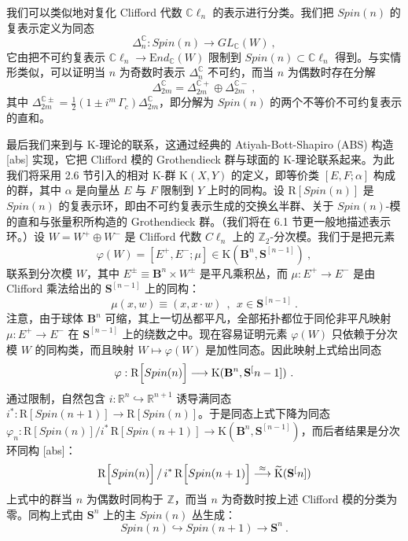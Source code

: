 \documentclass[11pt,a4paper]{ctexart}
\begin{document}
我们可以类似地对复化 Clifford 代数 \({\mathbb{C}}\ell_n\) 的表示进行分类。我们把 \(Spin(n)\) 的复表示定义为同态 \[\Delta^{{\mathbb{C}}}_n: Spin(n)\longrightarrow GL_{{\mathbb{C}}}(W)\ ,\] 它由把不可约复表示 \({\mathbb{C}}\ell_n
\rightarrow {\mathrm End}_{{\mathbb{C}}}(W)\) 限制到 \(Spin(n)\subset{\mathbb{C}}\ell_n\) 得到。与实情形类似，可以证明当 \(n\) 为奇数时表示 \(\Delta_n^{{\mathbb{C}}}\) 不可约，而当 \(n\) 为偶数时存在分解 \[\Delta_{2m}^{{\mathbb{C}}}=\Delta_{2m}^{{\mathbb{C}} +}\oplus
\Delta_{2m}^{{\mathbb{C}} -}\ ,\] 其中 \(\Delta_{2m}^{{\mathbb{C}}\pm}=\frac12(1\pm i^m\,\Gamma_c)
\Delta_{2m}^{{\mathbb{C}}}\)，即分解为 \(Spin(n)\) 的两个不等价不可约复表示的直和。

最后我们来到与 K-理论的联系，这通过经典的 Atiyah-Bott-Shapiro (ABS) 构造 [abs] 实现，它把 Clifford 模的 Grothendieck 群与球面的 K-理论联系起来。为此我们将采用 2.6 节引入的相对 K-群 \({\mathrm K}(X,Y)\) 的定义，即等价类 \([E,F;\alpha]\) 构成的群，其中 \(\alpha\) 是向量丛 \(E\) 与 \(F\) 限制到 \(Y\) 上时的同构。设 \({\mathrm R}[Spin(n)]\) 是 \(Spin(n)\) 的复表示环，即由不可约复表示生成的交换幺半群、关于 \(Spin(n)\)-模的直和与张量积所构造的 Grothendieck 群。（我们将在 6.1 节更一般地描述表示环。）设 \(W=W^+\oplus W^-\) 是 Clifford 代数 \(C\ell_n\) 上的 \({\mathbb{Z}}_2\)-分次模。我们于是把元素 \[\varphi(W)=[E^+,E^-;\mu]\in {\mathrm K}({\mathbf B}^n,{\mathbf S}^[n-1])\ ,\] 联系到分次模 \(W\)，其中 \(E^{\pm}\equiv {\mathbf B}^n\times W^{\pm}\) 是平凡乘积丛，而 \(\mu:E^+\rightarrow E^-\) 是由 Clifford 乘法给出的 \({\mathbf S}^[n-1]\) 上的同构： \[\mu(x,w)\equiv (x,x\cdot w)\ \ , \ \ x\in {\mathbf S}^[n-1]\ .\] 注意，由于球体 \({\mathbf B}^n\) 可缩，其上一切丛都平凡，全部拓扑都位于同伦非平凡映射 \(\mu:E^+\rightarrow E^-\) 在 \({\mathbf S}^[n-1]\) 上的绕数之中。现在容易证明元素 \(\varphi(W)\) 只依赖于分次模 \(W\) 的同构类，而且映射 \(W\mapsto\varphi(W)\) 是加性同态。因此映射上式给出同态 \[\varphi:{\mathrm R}\Bigl[Spin(n)\Bigr]
\longrightarrow {\mathrm K}({\mathbf B}^n,{\mathbf S}^[n-1])\ .\] 通过限制，自然包含 \(i:{\mathbb{R}}^n\hookrightarrow {\mathbb{R}}^{n+1}\) 诱导满同态 \(i^*:{\mathrm R}[Spin(n+1)]\rightarrow {\mathrm R}[Spin(n)]\)。于是同态上式下降为同态 \(\varphi_n:{\mathrm R}[Spin(n)]/i^*\,{\mathrm R}[Spin(n+1)]\rightarrow
{\mathrm K}({\mathbf B}^n,{\mathbf S}^[n-1])\)，而后者结果是分次环同构 [abs]： \[{\mathrm R}\Bigl[Spin(n)\Bigr]\,/\, i^*\,{\mathrm R}\Bigl[Spin(n+1)\Bigr]
\stackrel{\approx}{\longrightarrow}\widetilde{{\mathrm K}}({\mathbf S}^[n])\] 上式中的群当 \(n\) 为偶数时同构于 \({\mathbb{Z}}\)，而当 \(n\) 为奇数时按上述 Clifford 模的分类为零。同构上式由 \({\mathbf S}^n\) 上的主 \(Spin(n)\) 丛生成： \[Spin(n)\hookrightarrow Spin(n+1)\longrightarrow {\mathbf S}^n\ .\]
\end{document}

